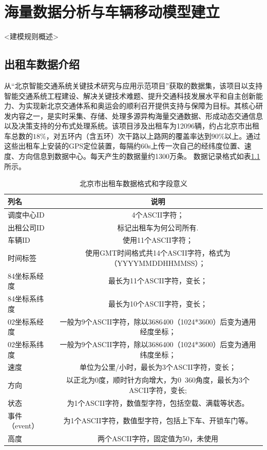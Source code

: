 \chapter{海量数据分析与车辆移动模型建立}

<建模规则概述>

\section{出租车数据介绍}
从“北京智能交通系统关键技术研究与应用示范项目”获取的数据集，该项目以支持智能交通系统工程建设、解决关键技术难题、提升交通科技发展水平和自主创新能力、为实现新北京交通体系和奥运会的顺利召开提供支持与保障为目标。其核心研发内容之一，是实时采集、存储、处理多源异构海量交通数据、形成动态交通信息以及决策支持的分布式处理系统。该项目涉及出租车为12096辆，约占北京市出租车总数的$18\%$，对五环内（含五环）次干路以上路网的覆盖率达到$90\%$以上。通过这些出租车上安装的GPS定位装置，每隔约60s上传一次自己的经纬度位置、速度、方向信息到数据中心。每天产生的数据量约1300万条。
数据记录格式如表\ref{table_dataset}所示。

\begin{table}
\caption{北京市出租车数据格式和字段意义}\label{table_dataset}
\begin{tabular}{l|c}
\hline
列名&	说明\\
\hline
调度中心ID&	4个ASCII字符；\\
\hline
出租公司ID&	标记出租车为何公司所有.\\
\hline
车辆ID&	使用11个ASCII字符；\\
\hline
时间标签&	使用GMT时间格式共14个ASCII字符，格式为（YYYYMMDDHHMMSS）；\\
\hline
84坐标系经度&	最长为11个ASCII字符，变长；\\
\hline
84坐标系纬度&	最长为10个ASCII字符，变长；\\
\hline
02坐标系经度&	一般为9个ASCII字符，除以3686400（1024*3600）后变为通用经度坐标；\\
\hline
02坐标系纬度&	一般为9个ASCII字符，除以3686400（1024*3600）后变为通用纬度坐标；\\
\hline
速度&	单位为公里/小时，最长为3个ASCII字符，变长；\\
\hline
方向&	以正北为0度，顺时针方向增大，为0~360角度，最长为3个ASCII字符，变长;\\
\hline
状态&	为1个ASCII字符，数值型字符，包括空载、满载等状态。\\
\hline
事件（event）&	为1个ASCII字符，数值型字符，包括上下车、开锁车门等。\\
\hline
高度&	两个ASCII字符，固定值为50，未使用\\
\hline
\end{tabular}
\end{table}


